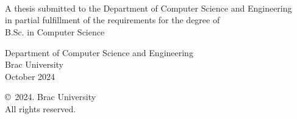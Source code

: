 

\begin{titlepage}
\renewcommand*{\thepage}{Title} %
    \begin{center} 
        \vspace*{3cm} %
        
        {\fontsize{16pt}{22pt}\selectfont{Deep Learning and NLP-Based Cardiac Risk Prediction \\ Using ECG and EHR Data}
        } 
        
        \vspace{1.5cm}
        
        
        \vspace{0.5cm}
            \color{\studentonecolor}
        	\studentonename\\\studentoneid\\
        	\color{\studenttwocolor}
	        \studenttwoname\\\studenttwoid\\
	        \color{\studentthreecolor}
	        \studentthreename\\\studentthreeid\\
	        \color{\studentfourcolor}
	        \studentfourname\\\studentfourid\\
            \color{black}
        \vspace{1.5cm}
        
        	A thesis submitted to the Department of Computer Science and Engineering\\
            in partial fulfillment of the requirements for the degree of\\
            B.Sc. in Computer Science

        
        \vspace{2.5cm}
        
    		Department of Computer Science and Engineering\\
            Brac University\\
            October 2024
        
        \vspace{3cm}
        
    		\copyright\ 2024. Brac University\\
            All rights reserved.
    
    \end{center}

\end{titlepage}